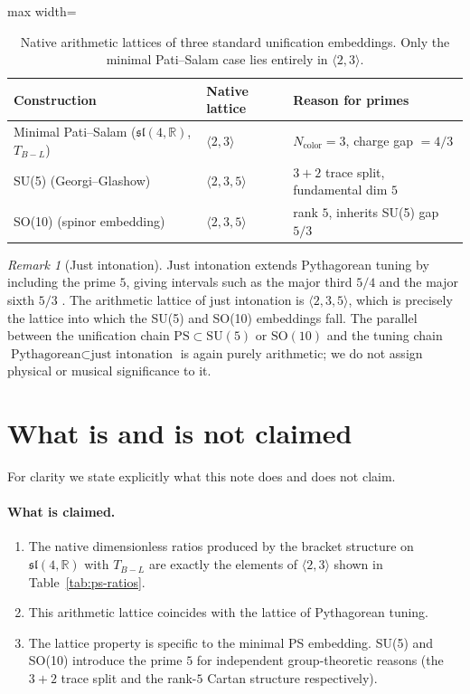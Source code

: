 \documentclass[11pt]{article}
\theoremstyle{plain}
\theoremstyle{remark}
\newtheorem*{remark}{Remark}
\newcommand{\sln}[1]{\mathfrak{sl}(#1,\mathbb{R})}
\newcommand{\TBL}{T_{B\!-\!L}}
\begin{document}
\begin{table}[h]
\centering
\small
\begin{adjustbox}{max width=\linewidth}\begin{tabular}{lll}
\toprule
Construction & Native lattice & Reason for primes \\
\midrule
Minimal Pati--Salam ($\sln{4}$, $\TBL$) & $\langle 2, 3 \rangle$
  & $N_{\mathrm{color}} = 3$, charge gap $= 4/3$ \\
SU(5) (Georgi--Glashow) & $\langle 2, 3, 5 \rangle$
  & $3 + 2$ trace split, fundamental dim $5$ \\
SO(10) (spinor embedding) & $\langle 2, 3, 5 \rangle$
  & rank $5$, inherits SU(5) gap $5/3$ \\
\bottomrule
\end{tabular}\end{adjustbox}
\caption{Native arithmetic lattices of three standard unification
embeddings.  Only the minimal Pati--Salam case lies entirely in
$\langle 2, 3 \rangle$.}
\label{tab:lattice-comparison}
\end{table}

\begin{remark}[Just intonation]
Just intonation extends Pythagorean tuning by including the prime
$5$, giving intervals such as the major third $5/4$ and the major
sixth $5/3$ \cite{Barker1989, Sethares2004}.  The arithmetic lattice
of just intonation is $\langle 2, 3, 5 \rangle$, which is precisely
the lattice into which the SU(5) and SO(10) embeddings fall.  The
parallel between the unification chain
$\mathrm{PS} \subset \mathrm{SU}(5)$ or $\mathrm{SO}(10)$
and the tuning chain $\text{Pythagorean} \subset \text{just intonation}$
is again purely arithmetic; we do not assign physical or musical
significance to it.
\end{remark}

\section{What is and is not claimed}

For clarity we state explicitly what this note does and does not
claim.

\paragraph{What is claimed.}
\begin{enumerate}\itemsep0pt
  \item The native dimensionless ratios produced by the bracket
    structure on $\sln{4}$ with $\TBL$ are exactly the elements of
    $\langle 2, 3 \rangle$ shown in Table~\ref{tab:ps-ratios}.
  \item This arithmetic lattice coincides with the lattice of
    Pythagorean tuning.
  \item The lattice property is specific to the minimal PS embedding.
    SU(5) and SO(10) introduce the prime $5$ for independent
    group-theoretic reasons (the $3+2$ trace split and the rank-$5$
    Cartan structure respectively).
\end{enumerate}
\end{document}
